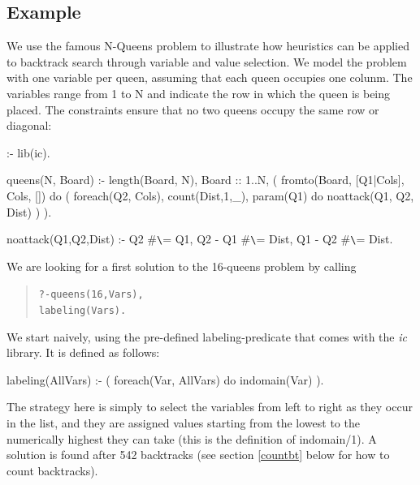 \subsection{Example}

We use the famous N-Queens problem to illustrate how heuristics can be applied
to backtrack search through variable and value selection.
We model the problem with one variable per queen, assuming that each queen
occupies one colunm. The variables range from 1 to N and indicate the row
in which the queen is being placed. The constraints ensure that no two
queens occupy the same row or diagonal:
\label{queenscode}
\begin{code}
:- lib(ic).

queens(N, Board) :-
        length(Board, N),
        Board :: 1..N,
        ( fromto(Board, [Q1|Cols], Cols, []) do
            ( foreach(Q2, Cols), count(Dist,1,_), param(Q1) do
                noattack(Q1, Q2, Dist)
            )
        ).

    noattack(Q1,Q2,Dist) :-
        Q2 #\verb.\.= Q1,
        Q2 - Q1 #\verb.\.= Dist,
        Q1 - Q2 #\verb.\.= Dist.
\end{code}
We are looking for a first solution to the 16-queens problem by calling
\begin{quote}\begin{alltt}
?- queens(16, Vars),   %
   labeling(Vars).     %
\end{alltt}\end{quote}
We start naively, using the pre-defined labeling-predicate that comes with the
{\em ic} library. It is defined as follows:
\begin{code}
labeling(AllVars) :-
        ( foreach(Var, AllVars) do
            indomain(Var)                       %
        ).
\end{code}
The strategy here is simply to select the variables
from left to right as they occur in the list, and they are
assigned values starting from the lowest to the numerically highest they can
take (this is the definition of indomain/1).
A solution is found after 542 backtracks
(see section \ref{countbt} below for how to count backtracks).

